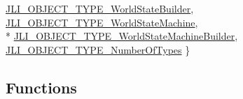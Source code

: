 \begin{DoxyCompactItemize}
\hyperlink{namespacejli_a11168ac254095f4ba73667ab33713b4faf2c29a63420b028a4ab247347b134968}{J\+L\+I\+\_\+\+O\+B\+J\+E\+C\+T\+\_\+\+T\+Y\+P\+E\+\_\+\+World\+State\+Builder}, 
\hyperlink{namespacejli_a11168ac254095f4ba73667ab33713b4faec7d71f74b14a31ecf4984b2e109edce}{J\+L\+I\+\_\+\+O\+B\+J\+E\+C\+T\+\_\+\+T\+Y\+P\+E\+\_\+\+World\+State\+Machine}, 
\\*
\hyperlink{namespacejli_a11168ac254095f4ba73667ab33713b4fa5e7f3ca8449bf25022f1b270b15063d3}{J\+L\+I\+\_\+\+O\+B\+J\+E\+C\+T\+\_\+\+T\+Y\+P\+E\+\_\+\+World\+State\+Machine\+Builder}, 
\hyperlink{namespacejli_a11168ac254095f4ba73667ab33713b4fa615463e81f6742b668633f9ccf74fccc}{J\+L\+I\+\_\+\+O\+B\+J\+E\+C\+T\+\_\+\+T\+Y\+P\+E\+\_\+\+Number\+Of\+Types}
 \}
\end{DoxyCompactItemize}
\subsection*{Functions}
